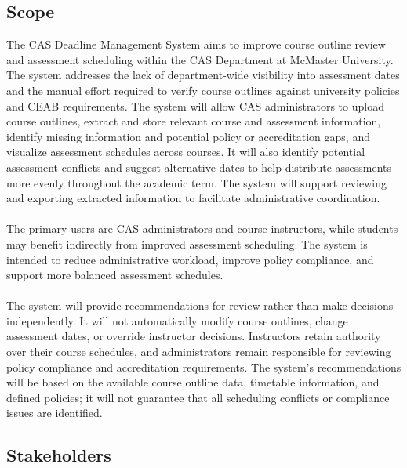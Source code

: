 \documentclass[12pt]{article}
\begin{document}
\subsection{Scope}
The CAS Deadline Management System aims to improve course outline review and assessment scheduling within 
the CAS Department at McMaster University. The system addresses the lack of 
department-wide visibility into assessment dates and the manual effort required to verify course outlines 
against university policies and CEAB requirements. The system will allow CAS administrators to upload course outlines, extract and store 
relevant course and assessment information, identify missing information and potential policy or accreditation 
gaps, and visualize assessment schedules across courses. It will also identify potential assessment conflicts 
and suggest alternative dates to help distribute assessments more evenly throughout the academic term. 
The system will support reviewing and exporting extracted information to facilitate administrative coordination.
\\ \\
The primary users are CAS administrators and course instructors, while students may benefit indirectly 
from improved assessment scheduling. The system is intended to reduce administrative workload, 
improve policy compliance, and support more balanced assessment schedules.
\\\\
The system will provide recommendations for review rather than make decisions independently. 
It will not automatically modify course outlines, change assessment dates, or override instructor decisions. 
Instructors retain authority over their course schedules, and administrators remain responsible for 
reviewing policy compliance and accreditation requirements. The system's recommendations will be based 
on the available course outline data, timetable information, and defined policies; it will not guarantee 
that all scheduling conflicts or compliance issues are identified.

\subsection{Stakeholders}

\end{document}
